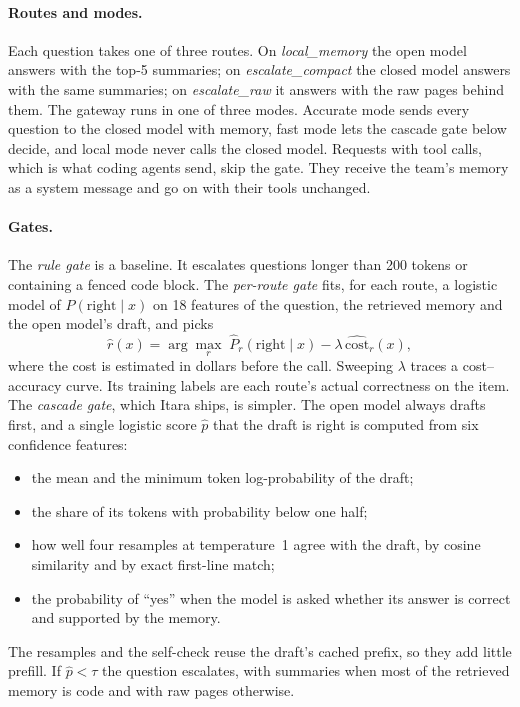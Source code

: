 \documentclass[10pt,twocolumn]{article}
\begin{document}
\paragraph{Routes and modes.} Each question takes one of three routes. On \emph{local\_memory} the open model answers with the top-5 summaries; on \emph{escalate\_compact} the closed model answers with the same summaries; on \emph{escalate\_raw} it answers with the raw pages behind them. The gateway runs in one of three modes. Accurate mode sends every question to the closed model with memory, fast mode lets the cascade gate below decide, and local mode never calls the closed model. Requests with tool calls, which is what coding agents send, skip the gate. They receive the team's memory as a system message and go on with their tools unchanged.

\paragraph{Gates.} The \emph{rule gate} is a baseline. It escalates questions longer than 200 tokens or containing a fenced code block. The \emph{per-route gate} fits, for each route, a logistic model of $P(\text{right}\mid x)$ on 18 features of the question, the retrieved memory and the open model's draft, and picks
\begin{equation}
\hat r(x)=\arg\max_{r} \; \hat P_r(\text{right}\mid x)-\lambda\,\widehat{\mathrm{cost}}_r(x),
\end{equation}
where the cost is estimated in dollars before the call. Sweeping $\lambda$ traces a cost--accuracy curve. Its training labels are each route's actual correctness on the item. The \emph{cascade gate}, which Itara ships, is simpler. The open model always drafts first, and a single logistic score $\hat p$ that the draft is right is computed from six confidence features:
\begin{itemize}
\item the mean and the minimum token log-probability of the draft;
\item the share of its tokens with probability below one half;
\item how well four resamples at temperature~1 agree with the draft, by cosine similarity and by exact first-line match;
\item the probability of ``yes'' when the model is asked whether its answer is correct and supported by the memory.
\end{itemize}
The resamples and the self-check reuse the draft's cached prefix, so they add little prefill. If $\hat p<\tau$ the question escalates, with summaries when most of the retrieved memory is code and with raw pages otherwise.
\end{document}
